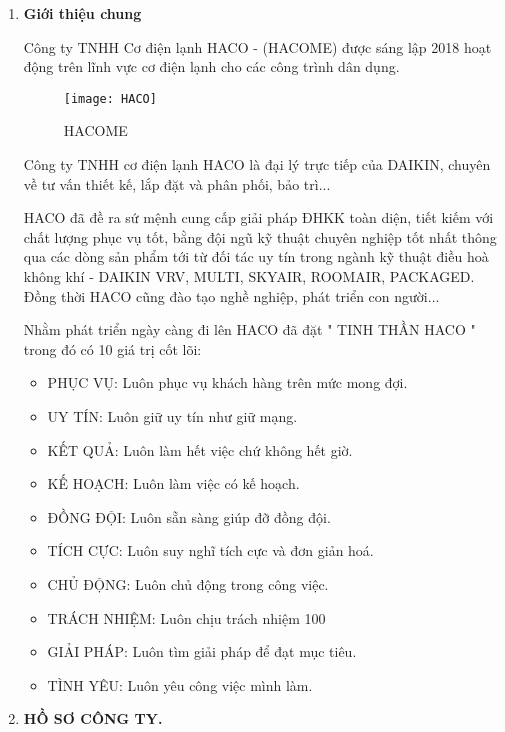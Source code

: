 \documentclass[12pt,a4paper]{article}
\begin{document}
\begin{enumerate}
   \item \textbf{Giới thiệu chung}
   
\hspace{1cm} Công ty TNHH Cơ điện lạnh HACO - (HACOME) được sáng lập 2018 hoạt động trên lĩnh vực cơ điện lạnh cho các công trình dân dụng.\\

\begin{figure}[H]
\centering
\texttt{[image: HACO]}
\caption{HACOME}
\end{figure}

\hspace{1cm} Công ty TNHH cơ điện lạnh HACO là đại lý trực tiếp của DAIKIN, chuyên về tư vấn thiết kế, lắp đặt và phân phối, bảo trì...

\hspace{1cm} HACO đã đề ra sứ mệnh cung cấp giải pháp ĐHKK toàn diện, tiết kiếm với chất lượng phục vụ tốt, bằng đội ngũ kỹ thuật chuyên nghiệp tốt nhất thông qua các dòng sản phẩm tới từ đối tác uy tín trong ngành kỹ thuật điều hoà không khí - DAIKIN VRV, MULTI, SKYAIR, ROOMAIR, PACKAGED. Đồng thời HACO cũng đào tạo nghề nghiệp, phát triển con người...

\hspace{1cm} Nhằm phát triển ngày càng đi lên HACO đã đặt " TINH THẦN HACO " trong đó có 10 giá trị cốt lõi:
\begin{itemize}
 \item PHỤC VỤ: Luôn phục vụ khách hàng trên mức mong đợi.
 \item UY TÍN: Luôn giữ uy tín như giữ mạng.
 \item KẾT QUẢ: Luôn làm hết việc chứ không hết giờ.
 \item KẾ HOẠCH: Luôn làm việc có kế hoạch.
 \item ĐỒNG ĐỘI: Luôn sẵn sàng giúp đỡ đồng đội.
 \item TÍCH CỰC: Luôn suy nghĩ tích cực và đơn giản hoá.
 \item CHỦ ĐỘNG: Luôn chủ động trong công việc.
 \item TRÁCH NHIỆM: Luôn chịu trách nhiệm 100%
 \item GIẢI PHÁP: Luôn tìm giải pháp để đạt mục tiêu.
 \item TÌNH YÊU: Luôn yêu công việc mình làm.
\end{itemize}

\newpage
\item \textbf{HỒ SƠ CÔNG TY.}


\end{enumerate}
\end{document}
